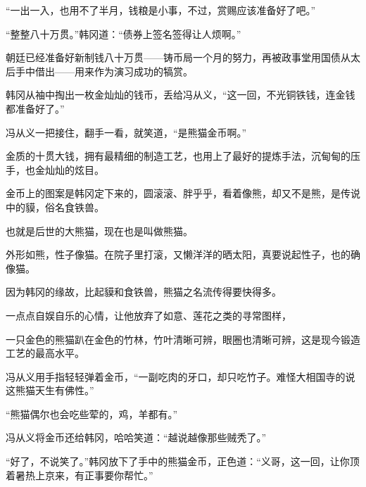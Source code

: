“一出一入，也用不了半月，钱粮是小事，不过，赏赐应该准备好了吧。”

“整整八十万贯。”韩冈道：“债券上签名签得让人烦啊。”

朝廷已经准备好新制钱八十万贯——铸币局一个月的努力，再被政事堂用国债从太后手中借出——用来作为演习成功的犒赏。

韩冈从袖中掏出一枚金灿灿的钱币，丢给冯从义，“这一回，不光铜铁钱，连金钱都准备好了。”

冯从义一把接住，翻手一看，就笑道，“是熊猫金币啊。”

金质的十贯大钱，拥有最精细的制造工艺，也用上了最好的提炼手法，沉甸甸的压手，也金灿灿的炫目。

金币上的图案是韩冈定下来的，圆滚滚、胖乎乎，看着像熊，却又不是熊，是传说中的貘，俗名食铁兽。

也就是后世的大熊猫，现在也是叫做熊猫。

外形如熊，性子像猫。在院子里打滚，又懒洋洋的晒太阳，真要说起性子，也的确像猫。

因为韩冈的缘故，比起貘和食铁兽，熊猫之名流传得要快得多。

一点点自娱自乐的心情，让他放弃了如意、莲花之类的寻常图样，

一只金色的熊猫趴在金色的竹林，竹叶清晰可辨，眼圈也清晰可辨，这是现今锻造工艺的最高水平。

冯从义用手指轻轻弹着金币，“一副吃肉的牙口，却只吃竹子。难怪大相国寺的说这熊猫天生有佛性。”

“熊猫偶尔也会吃些荤的，鸡，羊都有。”

冯从义将金币还给韩冈，哈哈笑道：“越说越像那些贼秃了。”

“好了，不说笑了。”韩冈放下了手中的熊猫金币，正色道：“义哥，这一回，让你顶着暑热上京来，有正事要你帮忙。”
